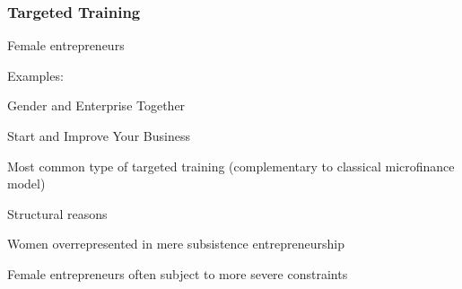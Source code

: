 \documentclass[hideothersubsections, usenames,dvipsnames,11pt]{beamer}
\newenvironment{itemize_2pt}{\itemize\addtolength{\itemsep}{2pt}}{\enditemize}
\begin{document}
\begin{frame}
\frametitle{Targeted Training}
	Female entrepreneurs
	\begin{itemize_2pt}
		\item Examples: 
		\begin{itemize_2pt}
			\item Gender and Enterprise Together \citep[GET Ahead, ILO;][]{Bulte2017, McKenziePuerto2021}
			\item Start and Improve Your Business \citep[SIYB, IFC;][]{deMel2014}
		\end{itemize_2pt}
		\item \textcolor{bdf}{Most common type of targeted training} (complementary to classical microfinance model)
		
		\vspace{0.5em}
		
		\item Structural reasons
		\begin{itemize_2pt}
			\item Women overrepresented in mere subsistence entrepreneurship
			\item Female entrepreneurs often subject to more severe constraints
			\item[] \citep[e.g., due to household-level reallocation; see][]{Bernhardt2019, deMel2009a}
		\end{itemize_2pt}
	\end{itemize_2pt}
\end{frame}
\end{document}
